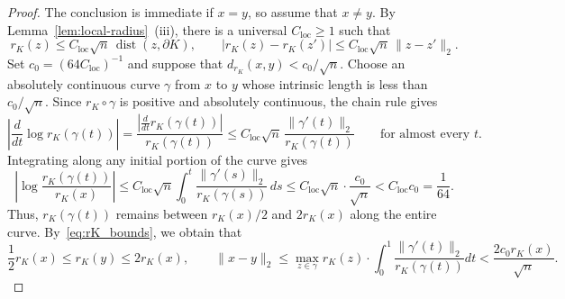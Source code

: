 \documentclass[11pt]{article}
\theoremstyle{definition}
\theoremstyle{remark}
\newcommand{\rK}{r_K}
\begin{document}
\begin{proof}
The conclusion is immediate if $x=y$, so assume that $x\ne y$.  By
Lemma~\ref{lem:local-radius}~\textup{(iii)}, there is a universal
$C_{\mathrm{loc}}\ge1$ such that
\begin{equation}\label{eq:local-radius-two-bounds}
 \rK(z)
 \le
 C_{\mathrm{loc}}\sqrt n\,\operatorname{dist}(z,\partial K),
 \qquad
 |\rK(z)-\rK(z')|
 \le
 C_{\mathrm{loc}}\sqrt n\,\|z-z'\|_2.
\end{equation}
Set $c_0=(64C_{\mathrm{loc}})^{-1}$ and suppose that
$d_{\rK}(x,y)<c_0/\sqrt n$.  Choose an absolutely continuous curve
$\gamma$ from $x$ to $y$ whose intrinsic length is less than
$c_0/\sqrt n$.  Since $\rK\circ\gamma$ is positive and absolutely
continuous, the chain rule gives
\[
 \left|\frac{d}{dt}\log\rK(\gamma(t))\right|=\frac{\left|\frac{d}{dt}\rK(\gamma(t))\right|}{\rK(\gamma(t))}
 \le
 C_{\mathrm{loc}}\sqrt n\,
 \frac{\|\gamma'(t)\|_2}{\rK(\gamma(t))}
 \qquad\text{for almost every }t.
\]
Integrating along any initial portion of the curve gives
\[
 \left|\log\frac{\rK(\gamma(t))}{\rK(x)}\right|\leq C_{\mathrm{loc}}\sqrt{n}\int_0^t \frac{\|\gamma'(s)\|_2}{\rK(\gamma(s))}\,ds\leq C_{\mathrm{loc}}\sqrt{n} \cdot \frac{c_0}{\sqrt{n}}
 <
 C_{\mathrm{loc}}c_0
 =
 \frac1{64}.
\]
Thus, $\rK(\gamma(t))$ remains between $\rK(x)/2$ and $2\rK(x)$ along
the entire curve.  By~\eqref{eq:rK_bounds}, we obtain that
\begin{equation}\label{eq:intrinsic-to-euclidean}
 \frac12\rK(x)\le\rK(y)\le2\rK(x),
 \qquad
 \|x-y\|_2\leq \max_{z\in \gamma} \rK(z)\cdot \int_0^1\frac{\|\gamma'(t)\|_2}{\rK(\gamma(t))}dt
 <
 \frac{2c_0\rK(x)}{\sqrt n}.
\end{equation}


\end{proof}
\end{document}
